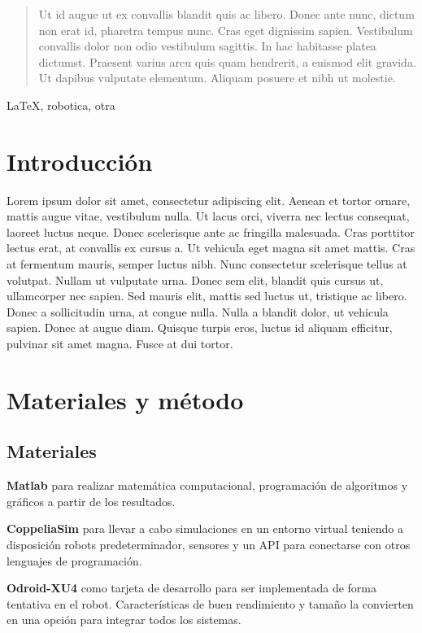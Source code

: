 \documentclass[conference]{IEEEtran}
\begin{document}
\begin{abstract}
  Ut id augue ut ex convallis blandit quis ac libero. Donec ante nunc, dictum non erat id, pharetra tempus nunc. Cras eget dignissim sapien. Vestibulum convallis dolor non odio vestibulum sagittis. In hac habitasse platea dictumst. Praesent varius arcu quis quam hendrerit, a euismod elit gravida. Ut dapibus vulputate elementum. Aliquam posuere et nibh ut molestie.
\end{abstract}

\begin{IEEEkeywords}
  \LaTeX, robotica, otra
\end{IEEEkeywords}

\section{Introducción}
Lorem ipsum dolor sit amet, consectetur adipiscing elit. Aenean et tortor ornare, mattis augue vitae, vestibulum nulla. Ut lacus orci, viverra nec lectus consequat, laoreet luctus neque. Donec scelerisque ante ac fringilla malesuada. Cras porttitor lectus erat, at convallis ex cursus a. Ut vehicula eget magna sit amet mattis. Cras at fermentum mauris, semper luctus nibh. Nunc consectetur scelerisque tellus at volutpat. Nullam ut vulputate urna. Donec sem elit, blandit quis cursus ut, ullamcorper nec sapien. Sed mauris elit, mattis sed luctus ut, tristique ac libero. Donec a sollicitudin urna, at congue nulla. Nulla a blandit dolor, ut vehicula sapien. Donec at augue diam. Quisque turpis eros, luctus id aliquam efficitur, pulvinar sit amet magna. Fusce at dui tortor.

\section{Materiales y método}
\subsection{Materiales}
\textbf{Matlab} para realizar matemática computacional, programación de algoritmos y
gráficos a partir de los resultados.

\textbf{CoppeliaSim} para llevar a cabo simulaciones en un entorno virtual teniendo a
disposición robots predeterminador, sensores y un API para conectarse con otros
lenguajes de programación.

\textbf{Odroid-XU4} como tarjeta de desarrollo para ser implementada de forma
tentativa en el robot. Características de buen rendimiento y tamaño la convierten
en una opción para integrar todos los sistemas.
\end{document}
